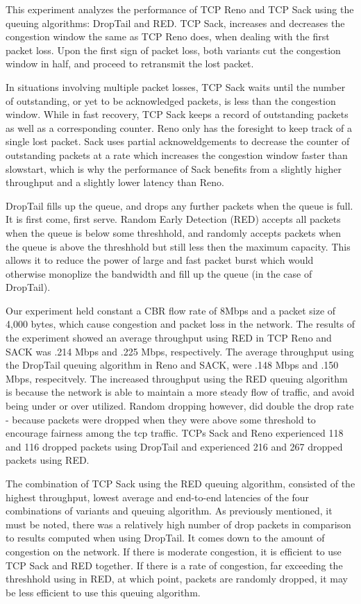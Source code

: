 This experiment analyzes the performance of TCP Reno and TCP Sack using the queuing algorithms: DropTail and RED. TCP Sack, increases and decreases the congestion window the same as TCP Reno does, when dealing with the first packet loss. Upon the first sign of packet loss, both variants cut the congestion window in half, and proceed to retransmit the lost packet. 

In situations involving multiple packet losses, TCP Sack waits until the number of outstanding, or yet to be acknowledged packets, is less than the congestion window. While in fast recovery, TCP Sack keeps a record of outstanding packets as well as a corresponding counter. Reno only has the foresight to keep track of a single lost packet. Sack uses partial acknoweldgements to decrease the counter of outstanding packets at a rate which increases the congestion window faster than slowstart, which is why the performance of Sack benefits from a slightly higher throughput and a slightly lower latency than Reno.

DropTail fills up the queue, and drops any further packets when the queue is full. It is first come, first serve. Random Early Detection (RED) accepts all packets when the queue is below some threshhold, and randomly accepts packets when the queue is above the threshhold but still less then the maximum capacity. This allows it to reduce the power of large and fast packet burst which would otherwise monoplize the bandwidth and fill up the queue (in the case of DropTail).

Our experiment held constant a CBR flow rate of 8Mbps and a packet size of 4,000 bytes, which cause congestion and packet loss in the network. The results of the experiment showed an average throughput using RED in TCP Reno and SACK was .214 Mbps and .225 Mbps, respectively. The average throughput using the DropTail queuing algorithm in Reno and SACK, were .148 Mbps and .150 Mbps, respecitvely. The increased throughput using the RED queuing algorithm is because the network is able to maintain a more steady flow of traffic, and avoid being under or over utilized. Random dropping however, did double the drop rate - because packets were dropped when they were above some threshold to encourage fairness among the tcp traffic. TCPs Sack and Reno experienced 118 and 116 dropped packets using DropTail and experienced 216 and 267 dropped packets using RED.

The combination of TCP Sack using the RED queuing algorithm, consisted of the highest throughput, lowest average and end-to-end latencies of the four combinations of variants and queuing algorithm. As previously mentioned, it must be noted, there was a relatively high number of drop packets in comparison to results computed when using DropTail. It comes down to the amount of congestion on the network. If there is moderate congestion, it is efficient to use TCP Sack and RED together. If there is a rate of congestion, far exceeding the threshhold using in RED, at which point, packets are randomly dropped, it may be less efficient to use this queuing algorithm.